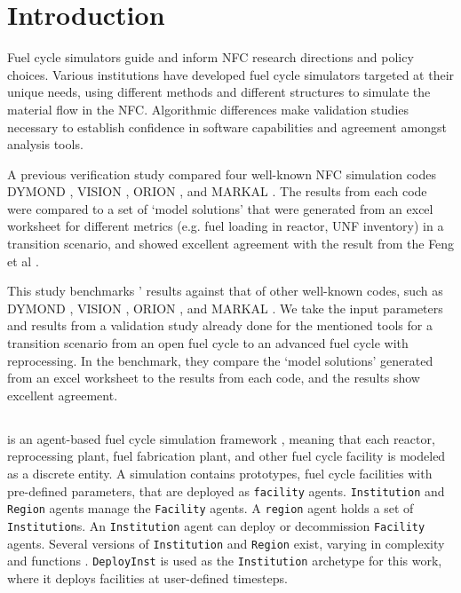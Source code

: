 
\section{Introduction}
Fuel cycle simulators guide and inform \gls{NFC} research directions and policy choices.
Various institutions have developed fuel cycle simulators targeted at their unique needs,
using different methods and different structures
to simulate the material flow in the \gls{NFC}.
Algorithmic differences make
validation studies necessary to establish
confidence in software capabilities and
agreement amongst analysis tools.

A previous verification study \cite{feng_standardized_2016} compared
four well-known \gls{NFC} simulation codes
DYMOND \cite{yacout_modeling_2005},
VISION \cite{jacobson_verifiable_2010},
ORION \cite{gregg_analysis_2012}, and
MARKAL \cite{shay_epa_2006}. The results from each code
were compared to a set of `model solutions' that were generated
from an excel worksheet for different metrics (e.g. fuel loading in reactor,
\gls{UNF} inventory) in a transition scenario, and showed excellent agreement
with the result from the Feng et al \cite{feng_standardized_2016}.


This study benchmarks \Cyclus' results
against that of other well-known codes, such as
DYMOND \cite{yacout_modeling_2005},
VISION \cite{jacobson_verifiable_2010},
ORION \cite{gregg_analysis_2012}, and
MARKAL \cite{shay_epa_2006}. We take the input
parameters and results from a validation study
\cite{feng_standardized_2016} already done for the
mentioned tools for a transition scenario from an
open fuel cycle to an advanced fuel cycle with
reprocessing. In the benchmark, they compare the `model solutions'
generated from an excel worksheet
to the results from each code, and the results show
excellent agreement.


\subsection{\Cyclus}

\Cyclus is an agent-based fuel cycle simulation framework 
\cite{huff_fundamental_2016}, meaning 
that each reactor, reprocessing plant, fuel fabrication plant, and other fuel cycle
facility is modeled as a discrete entity.
A \Cyclus simulation contains prototypes, fuel cycle facilities with
pre-defined parameters, that are deployed as \texttt{facility} agents.
\texttt{Institution} and \texttt{Region} agents manage the \texttt{Facility} agents.
A \texttt{region} agent holds a set of \texttt{Institution}s.
An \texttt{Institution} agent can deploy or decommission \texttt{Facility} agents.
Several versions of \texttt{Institution}
and \texttt{Region} exist, varying in complexity and functions \cite{huff_extensions_2014}.
 \texttt{DeployInst} is used as the \texttt{Institution} archetype for this work, where it
deploys facilities at user-defined timesteps.
